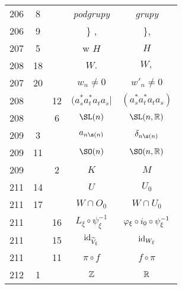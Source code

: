 \documentclass[a4paper,11pt]{article}
\begin{document}
\begin{center}
\begin{tabular}{|c|c|c|c|c|}
    206 &  8 & & \emph{podgrupy} & \emph{grupy} \\
    206 &  9 & & \} , & \}, \\
    207 &  5 & & w $H$ & $H$ \\
    208 & 18 & & $W.$ & $W,$ \\
    207 & 20 & & $w_{ n } \neq 0$ & $w'_{ n } \neq 0$ \\
    208 & & 12 & $( a^{ * }_{ s } a^{ * }_{ t } a_{ t } a_{ s } |$
           & $( a^{ * }_{ s } a^{ * }_{ t } a_{ t } a_{ s } )$ \\
    208 & &  6 & $\SL( n )$ & $\SL( n, \R )$ \\
    209 &  3 & & $a_{ n \s( n ) }$ & $\del_{ n \s( n ) }$ \\
    209 & 11 & & $\SO( n )$ & $\SO( n, \R )$ \\
    209 & &  2 & $K$ & $M$ \\
    211 & 14 & & $U$ & $U_{ 0 }$ \\
    211 & 17 & & $W \! \cap \! O_{ 0 }$ & $W \! \cap \! U_{ 0 }$ \\
    211 & & 16 & $L_{ \xi } \circ \psi_{ \xi }^{ -1 }$
           & $\varphi_{ \xi } \circ i_{ 0 } \circ \psi_{ \xi }^{ -1 }$ \\
    211 & & 15 & $\textrm{id}_{ \widetilde{ V }_{ \xi } }$ & $\textrm{id}_{ W_{ \xi } }$ \\
    211 & & 11 & $\pi \circ f$ & $f \circ \pi$ \\
    212 &  1 & & $\mathbb{Z}$ & $\mathbb{R}$ \\
    \hline
  \end{tabular}


\end{center}
\end{document}

